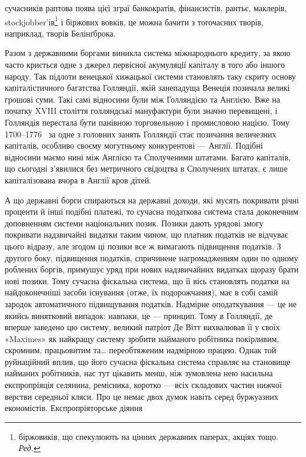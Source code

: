 \parcont{}  %
сучасників раптова поява цієї зграї банкократів, фінансистів, рантьє, маклерів,
stockjobber’ів\footnote*{
біржовиків, що спекулюють на цінних державних паперах, акціях тощо. \emph{Ред.}
} і
біржових вовків, це можна бачити з тогочасних творів, наприклад, творів Белінґброка.

Разом з державними боргами виникла система міжнароднього кредиту, за якою часто криється одне з
джерел первісної акумуляції капіталу в того або іншого народу. Так підлоти венецької хижацької
системи становлять таку скриту основу капіталістичного
багатства Голляндії, якій занепадуща Венеція позичала великі грошові суми. Такі самі відносини були
між Голляндією та Англією. Вже на початку XVIII століття голляндські мануфактури були значно
перевищені, і Голляндія перестала бути панівною торговельною і промисловою нацією. Тому 1700--1776~ за одне з головних занять Голляндії стає позичання величезних капіталів, особливо своєму
могутньому конкурентові — Англії. Подібні відносини маємо нині між Англією та Сполученими
штатами. Багато капіталів, що сьогодні з’явилися без метричного свідоцтва в Сполучених штатах, є
лише капіталізована вчора в Англії кров дітей.

А що державні борги спираються на державні доходи, які мусять покривати річні проценти й інші
подібні платежі, то сучасна податкова система стала доконечним доповненням системи національних
позик. Позики дають урядові змогу покривати
надзвичайні видатки таким чином, що платник податків не відчуває цього відразу, але згодом ці позики
все ж вимагають підвищення податків. З другого боку, підвищення податків, спричинене нагромадженням
один по одному роблених боргів, примушує
уряд при нових надзвичайних видатках щоразу брати нові позики. Тому сучасна фіскальна система, що її
вісь становлять податки на найдоконечніші засоби існування (отже, їх подорожчання), має в собі самій
зародок автоматичного підвищування податків. Надмірне оподаткування — це не якийсь винятковий
випадок: навпаки, це — принцип. Тому в Голляндії, де вперше заведено цю систему, великий патріот Де
Вітт вихвалював її у своїх «Maximes» як найкращу систему зробити найманого робітника покірливим,
скромним, працьовитим та\dots{} переобтяженим надмірною працею. Однак той руйнаційний вплив, що його
сучасна фіскальна система справляє на становище найманих робітників, нас тут цікавить менш, ніж
зумовлена нею насильна експропріяція селянина, ремісника, коротко — всіх складових частин нижчої
верстви середньої кляси. Про це немає двох думок навіть серед буржуазних економістів.
Експропріяторське діяння
\parbreak{}  %
